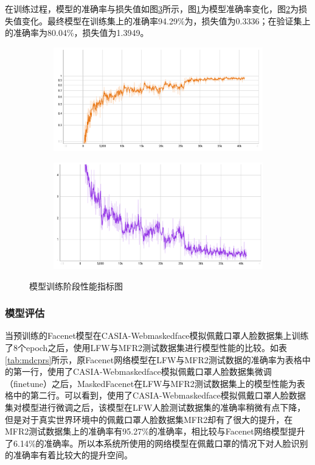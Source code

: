 在训练过程，模型的准确率与损失值如图\ref{fig:mdmtx}所示，图\ref{fig:acc}为模型准确率变化，图\ref{fig:loss}为损失值变化。最终模型在训练集上的准确率94.29\%为，损失值为0.3336；在验证集上的准确率为80.04\%，损失值为1.3949。

\begin{figure}[H]
    \centering
    \begin{subfigure}{.45\textwidth}
        \centering
        \includegraphics[width=\textwidth]{figures/5acc.png}
        \label{fig:acc}
    \end{subfigure}
    \qquad
    \begin{subfigure}{.45\textwidth}
        \centering
        \includegraphics[width=\textwidth]{figures/5loss.png}
        \label{fig:loss}
    \end{subfigure}
    \caption{模型训练阶段性能指标图}
    \label{fig:mdmtx}
\end{figure}

\subsubsection{模型评估}

当预训练的Facenet模型在CASIA-Webmaskedface模拟佩戴口罩人脸数据集上训练了8个epoch之后，使用LFW与MFR2测试数据集进行模型性能的比较。如表\ref{tab:mdcprs}所示，原Facenet网络模型在LFW与MFR2测试数据的准确率为表格中的第一行，使用了CASIA-Webmaskedface模拟佩戴口罩人脸数据集微调（finetune）之后，MaskedFacenet在LFW与MFR2测试数据集上的模型性能为表格中的第二行。可以看到，使用了CASIA-Webmaskedface模拟佩戴口罩人脸数据集对模型进行微调之后，该模型在LFW人脸测试数据集的准确率稍微有点下降，但是对于真实世界环境中的佩戴口罩人脸数据集MFR2却有了很大的提升，在MFR2测试数据集上的准确率有95.27\%的准确率，相比较与Facenet网络模型提升了6.14\%的准确率。所以本系统所使用的网络模型在佩戴口罩的情况下对人脸识别的准确率有着比较大的提升空间。

